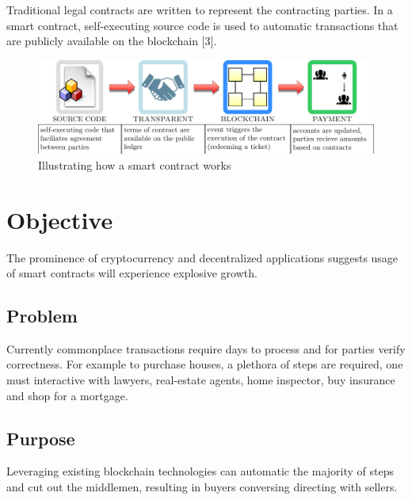 \documentclass[12pt]{scrreprt}
\begin{document}
\begin{appendices}
	
Traditional legal contracts are written to represent the contracting parties. In a smart contract, self-executing source code is used to automatic transactions that are publicly available on the blockchain [3].

\begin{figure}[ht]
		\centering
		\includegraphics[width=1\linewidth]{smartContractsExp.pdf}
		\caption{Illustrating how a smart contract works}
		\label{fig:smartContracts}
\end{figure}

\newpage 

\section{Objective}
The prominence of cryptocurrency and decentralized applications suggests usage of smart contracts will experience explosive growth.

\subsection{Problem}

Currently commonplace transactions require days to process and for parties verify correctness. For example to purchase houses, a plethora of steps are required, one must interactive with lawyers, real-estate agents, home inspector, buy insurance and shop for a mortgage. 

\subsection{Purpose}
Leveraging existing blockchain technologies can automatic the majority of steps and cut out the middlemen, resulting in buyers conversing directing with sellers.

\end{appendices}
\end{document}
